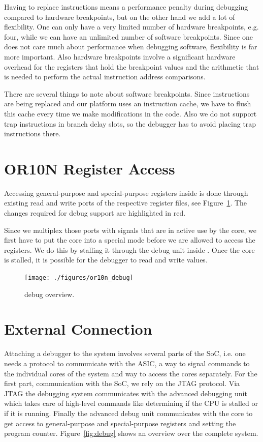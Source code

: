 Having to replace instructions means a performance penalty during debugging
compared to hardware breakpoints, but on the other hand we add a lot of
flexibility. One can only have a very limited number of hardware breakpoints,
e.g. four, while we can have an unlimited number of software breakpoints. Since
one does not care much about performance when debugging software, flexibility is
far more important. Also hardware breakpoints involve a significant hardware
overhead for the registers that hold the breakpoint values and the arithmetic
that is needed to perform the actual instruction address comparisons.

There are several things to note about software breakpoints. Since instructions
are being replaced and our platform uses an instruction cache, we have to flush
this cache every time we make modifications in the code. Also we do not support
trap instructions in branch delay slots, so the debugger has to avoid placing
trap instructions there.




\section{OR10N Register Access}

Accessing general-purpose and special-purpose registers inside \orion is done
through existing read and write ports of the respective register files, see
Figure~\ref{fig:or10n_debug}. The changes required for debug support are
highlighted in red.

Since we multiplex those ports with signals that are in active use by the core,
we first have to put the core into a special mode before we are allowed to
access the registers. We do this by stalling it through the debug unit inside
\orion. Once the core is stalled, it is possible for the debugger to read and
write values.

\begin{figure}[htbp]
  \centering
  \texttt{[image: ./figures/or10n\_debug]}
  \caption{\orion debug overview.}
  \label{fig:or10n_debug}
\end{figure}


\section{External Connection}

Attaching a debugger to the system involves several parts of the \gls{SoC},
i.e. one needs a protocol to communicate with the \gls{ASIC}, a way to signal
commands to the individual cores of the system and way to access the cores
separately.
For the first part, communication with the \gls{SoC}, we rely on the \gls{JTAG}
protocol. Via \gls{JTAG} the debugging system communicates with the advanced
debugging unit which takes care of high-level commands like determining if the
\gls{CPU} is stalled or if it is running. Finally the advanced debug unit
communicates with the \orion core to get access to general-purpose and
special-purpose registers and setting the program counter.
Figure~\ref{fig:debug} shows an overview over the complete system.

